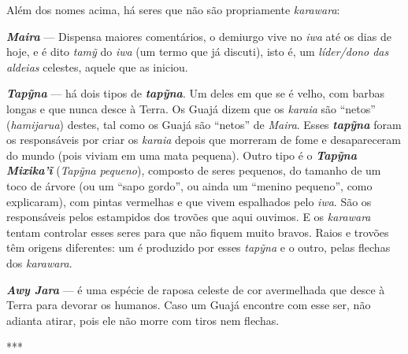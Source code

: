 Além dos nomes acima, há seres que não são propriamente \emph{karawara}:

\emph{\textbf{Maira}} --- Dispensa maiores comentários, o demiurgo vive no
\emph{iwa} até os dias de hoje, e é dito \emph{tamỹ} do \emph{iwa} (um
termo que já discuti), isto é, um \emph{líder/dono das aldeias}
celestes, aquele que as iniciou.

\emph{\textbf{Tapỹna}} --- há dois tipos de \emph{\textbf{tapỹna}}. Um
deles em que se é velho, com barbas longas e que nunca desce à Terra. Os
Guajá dizem que os \emph{karaia} são ``netos'' (\emph{hamijarua}) destes,
tal como os Guajá são ``netos'' de \emph{Maira}. Esses
\emph{\textbf{tapỹna}} foram os responsáveis por criar os \emph{karaia}
depois que morreram de fome e desapareceram do mundo (pois viviam em uma
mata pequena). Outro tipo é o \textbf{\emph{Tapỹna Mixika'ĩ}}
(\emph{Tapỹna} \emph{pequeno}), composto de seres pequenos, do tamanho
de um toco de árvore (ou um ``sapo gordo'', ou ainda um ``menino pequeno'',
como explicaram), com pintas vermelhas e que vivem espalhados pelo
\emph{iwa}. São os responsáveis pelos estampidos dos trovões que aqui
ouvimos. E os \emph{karawara} tentam controlar esses seres para que não
fiquem muito bravos. Raios e trovões têm origens diferentes: um é
produzido por esses \emph{tapỹna} e o outro, pelas flechas dos
\emph{karawara}.

\emph{\textbf{Awy Jara}} --- é uma espécie de raposa celeste de cor
avermelhada que desce à Terra para devorar os humanos. Caso um Guajá
encontre com esse ser, não adianta atirar, pois ele não morre com tiros
nem flechas.

\begin{center}
***
\end{center}

